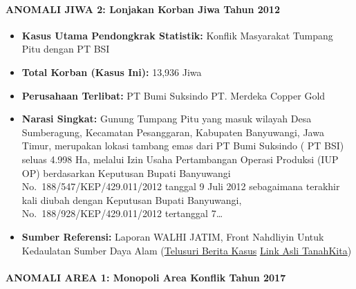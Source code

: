 \documentclass[
]{article}
\providecommand{\tightlist}{%
  \setlength{\itemsep}{0pt}\setlength{\parskip}{0pt}}
\begin{document}
\paragraph{ANOMALI JIWA 2: Lonjakan Korban Jiwa Tahun
2012}\label{anomali-jiwa-2-lonjakan-korban-jiwa-tahun-2012}

\begin{itemize}
\tightlist
\item
  \textbf{Kasus Utama Pendongkrak Statistik:} Konflik Masyarakat Tumpang
  Pitu dengan PT BSI
\item
  \textbf{Total Korban (Kasus Ini):} 13,936 Jiwa
\item
  \textbf{Perusahaan Terlibat:} PT Bumi Suksindo \textbar{} PT. Merdeka
  Copper Gold
\item
  \textbf{Narasi Singkat:} Gunung Tumpang Pitu yang masuk wilayah Desa
  Sumberagung, Kecamatan Pesanggaran, Kabupaten Banyuwangi, Jawa Timur,
  merupakan lokasi tambang emas dari PT Bumi Suksindo ( PT BSI) seluas
  4.998 Ha, melalui Izin Usaha Pertambangan Operasi Produksi (IUP OP)
  berdasarkan Keputusan Bupati Banyuwangi No.~188/547/KEP/429.011/2012
  tanggal 9 Juli 2012 sebagaimana terakhir kali diubah dengan Keputusan
  Bupati Banyuwangi, No.~188/928/KEP/429.011/2012 tertanggal 7\ldots{}
\item
  \textbf{Sumber Referensi:} Laporan WALHI JATIM, Front Nahdliyin Untuk
  Kedaulatan Sumber Daya Alam
  (\href{https://www.google.com/search?q=Konflik\%20Masyarakat\%20Tumpang\%20Pitu\%20dengan\%20PT\%20BSI\%20PT\%20Bumi\%20Suksindo\%20\%7C\%20PT.\%20Merdeka\%20Copper\%20Gold}{Telusuri
  Berita Kasus} \textbar{}
  \href{https://tanahkita.id/data/konflik/detil/WWg2QmItRXZ4SGs}{Link
  Asli TanahKita})
\end{itemize}

\paragraph{ANOMALI AREA 1: Monopoli Area Konflik Tahun
2017}\label{anomali-area-1-monopoli-area-konflik-tahun-2017}
\end{document}

